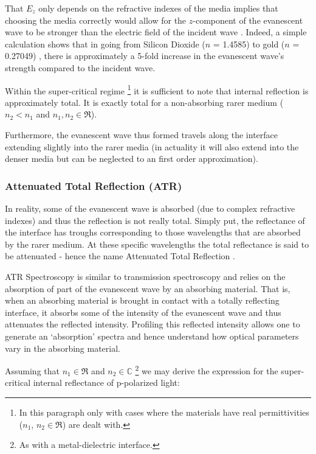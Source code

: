 That $E_z$ only depends on the refractive indexes of the media implies that choosing the media correctly would allow for the $z$-component of the evanescent wave to be stronger than the electric field of the incident wave \cite{ATR_book}. Indeed, a simple calculation shows that in going from Silicon Dioxide ($n$ = 1.4585) to gold ($n$ = 0.27049) \cite{ref_index_db}, there is approximately a 5-fold increase in the evanescent wave's strength compared to the incident wave. 

Within the super-critical regime \footnote{ In this paragraph only with cases where the materials have real permittivities ($n_1$, $n_2 \in \Re$) are dealt with.} it is sufficient to note that internal reflection is approximately total. It is exactly total for a non-absorbing rarer medium ($n_2<n_1$ and  $n_1, n_2 \in \Re$).

Furthermore, the evanescent wave thus formed travels along the interface extending slightly into the rarer media (in actuality it will also extend into the denser media but can be neglected to an first order approximation).

\subsubsection{Attenuated Total Reflection (ATR)}

In reality, some of the evanescent wave is absorbed (due to complex refractive indexes) and thus the reflection is not really total. Simply put, the reflectance of the interface has troughs corresponding to those wavelengths that are absorbed by the rarer medium. At these specific wavelengths the total reflectance is said to be attenuated - hence the name Attenuated Total Reflection \cite{ATR_book}. 

ATR Spectroscopy is similar to transmission spectroscopy and relies on the absorption of part of the evanescent wave by an absorbing material. That is, when an absorbing material is brought in contact with a totally reflecting interface, it absorbs some of the intensity of the evanescent wave and thus attenuates the reflected intensity. Profiling this reflected intensity allows one to generate an `absorption' spectra and hence understand how optical parameters vary in the absorbing material.

Assuming that $n_1 \in \Re$ and $n_2 \in \mathbb{C}$ \footnote{As with a metal-dielectric interface.} we may derive the expression for the super-critical internal reflectance of p-polarized light:

